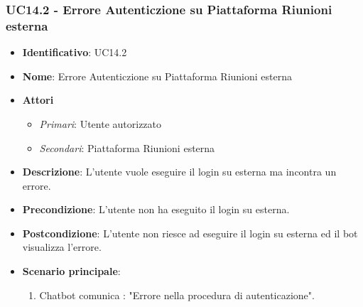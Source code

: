 \subsubsection{UC14.2 - Errore Autenticzione su Piattaforma Riunioni esterna}
\begin{itemize}
	\item \textbf{Identificativo}: UC14.2
	\item \textbf{Nome}: Errore Autenticzione su Piattaforma Riunioni esterna
	\item \textbf{Attori}
	\begin{itemize} 
		\item \textit{Primari}: Utente autorizzato
		\item \textit{Secondari}: Piattaforma Riunioni esterna
	\end{itemize}
	\item \textbf{Descrizione}: L'utente vuole eseguire il login su  esterna ma incontra un errore.
	\item \textbf{Precondizione}: L'utente non ha eseguito il login su  esterna.
	\item \textbf{Postcondizione}: L'utente non riesce ad eseguire il login su  esterna ed il bot visualizza l'errore.
	\item \textbf{Scenario principale}: \begin{enumerate}
		\item Chatbot comunica : "Errore nella procedura di autenticazione". 
	\end{enumerate}
\end{itemize}

